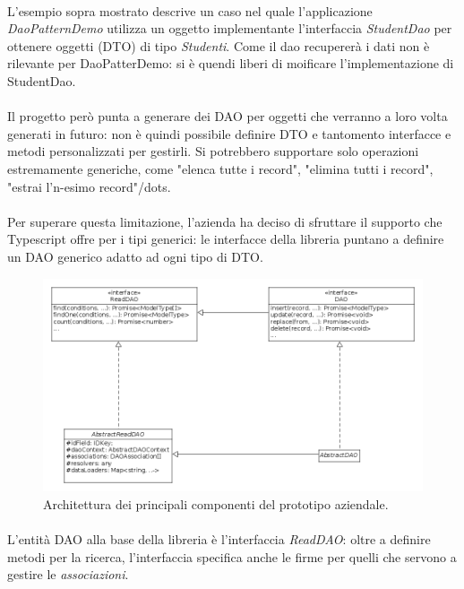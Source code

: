 \documentclass[a4paper, 12pt]{report}
\begin{document}
    \paragraph*{}
    L'esempio sopra mostrato descrive un caso nel quale l'applicazione \emph{DaoPatternDemo} utilizza un oggetto implementante l'interfaccia \emph{StudentDao} per ottenere oggetti (DTO) di tipo \emph{Studenti}.
    Come il dao recupererà i dati non è rilevante per DaoPatterDemo: si è quendi liberi di moificare l'implementazione di StudentDao.
    \paragraph*{}
    Il progetto però punta a generare dei DAO per oggetti che verranno a loro volta generati in futuro: non è quindi possibile definire DTO e tantomento interfacce e metodi personalizzati per gestirli.
    Si potrebbero supportare solo operazioni estremamente generiche, come "elenca tutte i record", "elimina tutti i record", "estrai l'n-esimo record"/dots.
    \paragraph*{}
    Per superare questa limitazione, l'azienda ha deciso di sfruttare il supporto che Typescript offre per i tipi generici: le interfacce della libreria puntano a definire un DAO generico adatto ad ogni tipo di DTO.
    \begin{figure}[H]
      \includegraphics[width=\textwidth]{prototype-architecture.png}
      \caption{Architettura dei principali componenti del prototipo aziendale.}
    \end{figure}
    \paragraph*{}
    L'entità DAO alla base della libreria è l'interfaccia \emph{ReadDAO}: oltre a definire metodi per la ricerca, l'interfaccia specifica anche le firme per quelli che servono a gestire le \emph{associazioni}.
\end{document}
